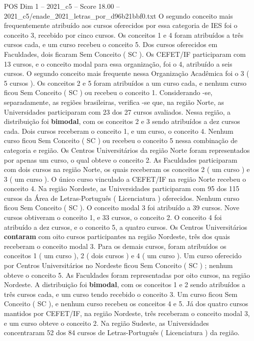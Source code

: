 \begin{textsample}{POS Dim 1 – 2021\_c5 – Score 18.00 – 2021\_c5/enade\_2021\_letras\_por\_d96b21bbf0.txt}
O segundo conceito mais frequentemente atribuído aos cursos oferecidos por essa categoria de IES foi o conceito 3, recebido por cinco cursos.
Os conceitos 1 e 4 foram atribuídos a três cursos cada, e um curso recebeu o conceito 5.
Dos cursos oferecidos em Faculdades, dois ficaram Sem Conceito ( SC ).
Os CEFET/IF participaram com 13 cursos, e o conceito modal para essa organização, foi o 4, atribuído a seis cursos.
O segundo conceito mais frequente nessa Organização Acadêmica foi o 3 ( 5 cursos ).
Os conceitos 2 e 5 foram atribuídos a um curso cada, e nenhum curso ficou Sem Conceito ( SC ) ou recebeu o conceito 1.
Considerando -se, separadamente, as regiões brasileiras, verifica -se que, na região Norte, as Universidades participaram com 23 dos 27 cursos avaliados.
Nessa região, a distribuição foi \textbf{bimodal}, com os conceitos 2 e 3 sendo atribuídos a dez cursos cada.
Dois cursos receberam o conceito 1, e um curso, o conceito 4.
Nenhum curso ficou Sem Conceito ( SC ) ou recebeu o conceito 5 nessa combinação de categoria e região.
Os Centros Universitários da região Norte foram representados por apenas um curso, o qual obteve o conceito 2.
As Faculdades participaram com dois cursos na região Norte, os quais receberam os conceitos 2 ( um curso ) e 3 ( um curso ).
O único curso vinculado a CEFET/IF na região Norte recebeu o conceito 4.
Na região Nordeste, as Universidades participaram com 95 dos 115 cursos da Área de Letras-Português ( Licenciatura ) oferecidos.
Nenhum curso ficou Sem Conceito ( SC ).
O conceito modal 3 foi atribuído a 39 cursos.
Nove cursos obtiveram o conceito 1, e 33 cursos, o conceito 2.
O conceito 4 foi atribuído a dez cursos, e o conceito 5, a quatro cursos.
Os Centros Universitários \textbf{contaram} com oito cursos participantes na região Nordeste, três dos quais receberam o conceito modal 3.
Para os demais cursos, foram atribuídos os conceitos 1 ( um curso ), 2 ( dois cursos ) e 4 ( um curso ).
Um curso oferecido por Centros Universitários no Nordeste ficou Sem Conceito ( SC ) ; nenhum obteve o conceito 5.
As Faculdades foram representadas por oito cursos, na região Nordeste.
A distribuição foi \textbf{bimodal}, com os conceitos 1 e 2 sendo atribuídos a três cursos cada, e um curso tendo recebido o conceito 3.
Um curso ficou Sem Conceito ( SC ), e nenhum curso recebeu os conceitos 4 e 5.
Já dos quatro cursos mantidos por CEFET/IF, na região Nordeste, três receberam o conceito modal 3, e um curso obteve o conceito 2.
Na região Sudeste, as Universidades concentraram 52 dos 84 cursos de Letras-Português ( Licenciatura ) da região.

\end{textsample}
